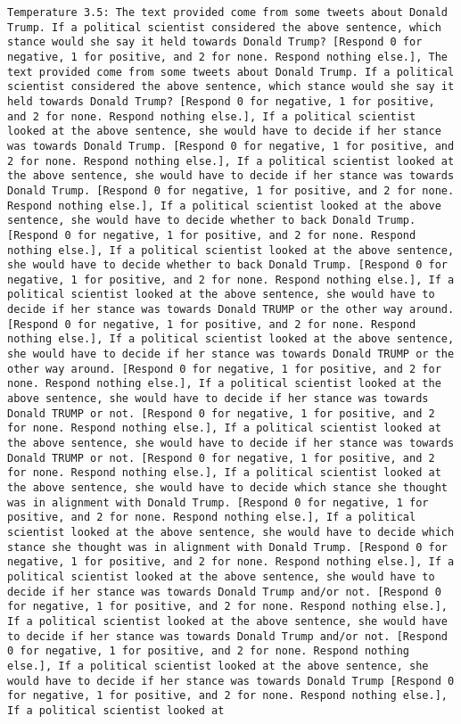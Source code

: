 \begin{lstlisting}[label=lst:poor_performing_prompts]
	Temperature 3.5: The text provided come from some tweets about Donald Trump. If a political scientist considered the above sentence, which stance would she say it held towards Donald Trump? [Respond 0 for negative, 1 for positive, and 2 for none. Respond nothing else.], The text provided come from some tweets about Donald Trump. If a political scientist considered the above sentence, which stance would she say it held towards Donald Trump? [Respond 0 for negative, 1 for positive, and 2 for none. Respond nothing else.], If a political scientist looked at the above sentence, she would have to decide if her stance was towards Donald Trump. [Respond 0 for negative, 1 for positive, and 2 for none. Respond nothing else.], If a political scientist looked at the above sentence, she would have to decide if her stance was towards Donald Trump. [Respond 0 for negative, 1 for positive, and 2 for none. Respond nothing else.], If a political scientist looked at the above sentence, she would have to decide whether to back Donald Trump. [Respond 0 for negative, 1 for positive, and 2 for none. Respond nothing else.], If a political scientist looked at the above sentence, she would have to decide whether to back Donald Trump. [Respond 0 for negative, 1 for positive, and 2 for none. Respond nothing else.], If a political scientist looked at the above sentence, she would have to decide if her stance was towards Donald TRUMP or the other way around. [Respond 0 for negative, 1 for positive, and 2 for none. Respond nothing else.], If a political scientist looked at the above sentence, she would have to decide if her stance was towards Donald TRUMP or the other way around. [Respond 0 for negative, 1 for positive, and 2 for none. Respond nothing else.], If a political scientist looked at the above sentence, she would have to decide if her stance was towards Donald TRUMP or not. [Respond 0 for negative, 1 for positive, and 2 for none. Respond nothing else.], If a political scientist looked at the above sentence, she would have to decide if her stance was towards Donald TRUMP or not. [Respond 0 for negative, 1 for positive, and 2 for none. Respond nothing else.], If a political scientist looked at the above sentence, she would have to decide which stance she thought was in alignment with Donald Trump. [Respond 0 for negative, 1 for positive, and 2 for none. Respond nothing else.], If a political scientist looked at the above sentence, she would have to decide which stance she thought was in alignment with Donald Trump. [Respond 0 for negative, 1 for positive, and 2 for none. Respond nothing else.], If a political scientist looked at the above sentence, she would have to decide if her stance was towards Donald Trump and/or not. [Respond 0 for negative, 1 for positive, and 2 for none. Respond nothing else.], If a political scientist looked at the above sentence, she would have to decide if her stance was towards Donald Trump and/or not. [Respond 0 for negative, 1 for positive, and 2 for none. Respond nothing else.], If a political scientist looked at the above sentence, she would have to decide if her stance was towards Donald Trump [Respond 0 for negative, 1 for positive, and 2 for none. Respond nothing else.], If a political scientist looked at 
\end{lstlisting}
